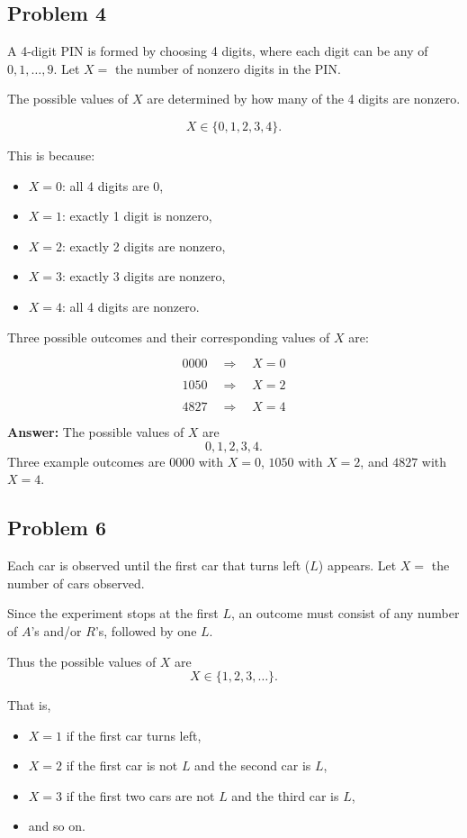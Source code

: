 \documentclass[11pt]{article}
\begin{document}
\subsection*{Problem 4}

A 4-digit PIN is formed by choosing 4 digits, where each digit can be any of \(0,1,\dots,9\).  
Let \(X=\) the number of nonzero digits in the PIN.

The possible values of \(X\) are determined by how many of the 4 digits are nonzero.

\[
X \in \{0,1,2,3,4\}.
\]

This is because:
\begin{itemize}
    \item \(X=0\): all 4 digits are \(0\),
    \item \(X=1\): exactly 1 digit is nonzero,
    \item \(X=2\): exactly 2 digits are nonzero,
    \item \(X=3\): exactly 3 digits are nonzero,
    \item \(X=4\): all 4 digits are nonzero.
\end{itemize}

Three possible outcomes and their corresponding values of \(X\) are:

\[
0000 \quad \Rightarrow \quad X=0
\]

\[
1050 \quad \Rightarrow \quad X=2
\]

\[
4827 \quad \Rightarrow \quad X=4
\]

\textbf{Answer:} The possible values of \(X\) are
\[
\boxed{0,1,2,3,4}.
\]
Three example outcomes are \(0000\) with \(X=0\), \(1050\) with \(X=2\), and \(4827\) with \(X=4\).

\subsection*{Problem 6}

Each car is observed until the first car that turns left (\(L\)) appears.  
Let \(X=\) the number of cars observed.

Since the experiment stops at the first \(L\), an outcome must consist of any number of \(A\)'s and/or \(R\)'s, followed by one \(L\).

Thus the possible values of \(X\) are
\[
X \in \{1,2,3,\dots\}.
\]

That is,
\begin{itemize}
    \item \(X=1\) if the first car turns left,
    \item \(X=2\) if the first car is not \(L\) and the second car is \(L\),
    \item \(X=3\) if the first two cars are not \(L\) and the third car is \(L\),
    \item and so on.
\end{itemize}
\end{document}

